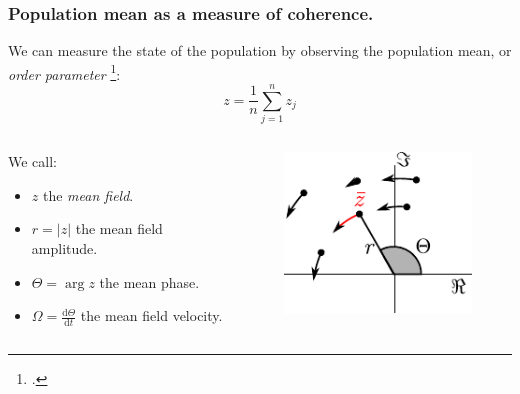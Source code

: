 \documentclass[10pt,reqno]{beamer}
\newcommand{\D}[2]{\frac{\mathrm{d} #1}{\mathrm{d} #2}}
\renewcommand{\mod}[1]{\left|#1\right|}
\begin{document}
\begin{frame}
\frametitle{Population mean as a measure of coherence.}
We can measure the state of the population by observing the population mean, or {\em order parameter} \footcite{kuramoto75}:
\[
z = \frac{1}{n}\sum_{j=1}^n z_j
\]
\begin{columns}
\begin{column}{0.59\textwidth}
We call:
\begin{itemize}
\item $z$ the {\em mean field}.
\item $r=\mod{z}$ the mean field amplitude.
\item $\Theta = \arg{z}$ the mean phase.
\item $\Omega = \D{\Theta}{t}$ the mean field velocity.
\end{itemize}
\end{column}
\begin{column}{0.39\textwidth}
\begin{figure}
\includegraphics{meanfield.pdf}
\end{figure}
\end{column}
\end{columns}
\end{frame}
\end{document}
